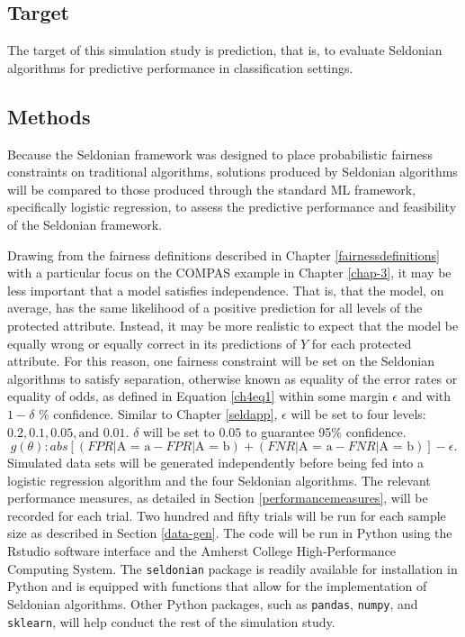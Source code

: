 \documentclass[12pt, twoside]{amherstthesis}
\begin{document}
\hypertarget{target}{%
\subsection{Target}\label{target}}

The target of this simulation study is prediction, that is, to evaluate Seldonian algorithms for predictive performance in classification settings.

\hypertarget{methods}{%
\subsection{Methods}\label{methods}}

Because the Seldonian framework was designed to place probabilistic fairness constraints on traditional algorithms, solutions produced by Seldonian algorithms will be compared to those produced through the standard ML framework, specifically logistic regression, to assess the predictive performance and feasibility of the Seldonian framework.

Drawing from the fairness definitions described in Chapter \ref{fairnessdefinitions} with a particular focus on the COMPAS example in Chapter \ref{chap-3}, it may be less important that a model satisfies independence. That is, that the model, on average, has the same likelihood of a positive prediction for all levels of the protected attribute. Instead, it may be more realistic to expect that the model be equally wrong or equally correct in its predictions of \(Y\) for each protected attribute. For this reason, one fairness constraint will be set on the Seldonian algorithms to satisfy separation, otherwise known as equality of the error rates or equality of odds, as defined in Equation \ref{ch4eq1} within some margin \(\epsilon\) and with \(1 - \delta\) \% confidence. Similar to Chapter \ref{seldapp}, \(\epsilon\) will be set to four levels: \(0.2, 0.1, 0.05, \text{and } 0.01\). \(\delta\) will be set to \(0.05\) to guarantee 95\% confidence.
\begin{equation}
\label{ch4eq1}
g(\theta): abs[(FPR | \text{A = a} - FPR | \text{A = b}) + (FNR | \text{A = a} - FNR | \text{A = b})] - \epsilon.
\end{equation}
Simulated data sets will be generated independently before being fed into a logistic regression algorithm and the four Seldonian algorithms. The relevant performance measures, as detailed in Section \ref{performancemeasures}, will be recorded for each trial. Two hundred and fifty trials will be run for each sample size as described in Section \ref{data-gen}. The code will be run in Python using the Rstudio software interface and the Amherst College High-Performance Computing System. The \texttt{seldonian} package is readily available for installation in Python and is equipped with functions that allow for the implementation of Seldonian algorithms. Other Python packages, such as \texttt{pandas}, \texttt{numpy}, and \texttt{sklearn}, will help conduct the rest of the simulation study.
\end{document}
